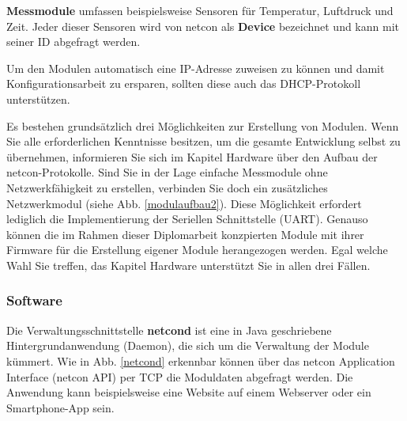 \documentclass[a4paper,14pt,headsepline]{scrartcl}
\begin{document}
\textbf{Messmodule} umfassen beispielsweise Sensoren für Temperatur, Luftdruck und Zeit. Jeder dieser Sensoren wird von netcon als \textbf{Device} bezeichnet und kann mit seiner ID abgefragt werden.

Um den Modulen automatisch eine IP-Adresse zuweisen zu können und damit Konfigurationsarbeit zu ersparen, sollten diese auch das DHCP-Protokoll unterstützen.

Es bestehen grundsätzlich drei Möglichkeiten zur Erstellung von Modulen. Wenn Sie alle erforderlichen Kenntnisse besitzen, um die gesamte Entwicklung selbst zu übernehmen, informieren Sie sich im Kapitel Hardware über den Aufbau der netcon-Protokolle. Sind Sie in der Lage einfache Messmodule ohne Netzwerkfähigkeit zu erstellen, verbinden Sie doch ein zusätzliches Netzwerkmodul (siehe Abb. \ref{modulaufbau2}). Diese Möglichkeit erfordert lediglich die Implementierung der Seriellen Schnittstelle (UART). Genauso können die im Rahmen dieser Diplomarbeit konzpierten Module mit ihrer Firmware für die Erstellung eigener Module herangezogen werden. Egal welche Wahl Sie treffen, das Kapitel Hardware unterstützt Sie in allen drei Fällen.

\begin{figure}[h]
\begin{center}
\end{center}
\end{figure}

\newpage

\subsubsection{Software}
Die Verwaltungsschnittstelle \textbf{netcond} ist eine in Java geschriebene Hintergrundanwendung (Daemon), die sich um die Verwaltung der Module kümmert. Wie in Abb. \ref{netcond} erkennbar können über das netcon Application Interface (netcon API) per TCP die Moduldaten abgefragt werden. Die Anwendung kann beispielsweise eine Website auf einem Webserver oder ein Smartphone-App sein. 
\end{document}
